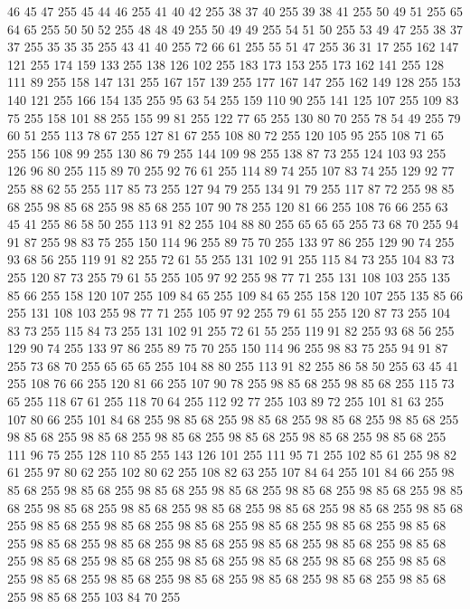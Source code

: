 46 45 47 255 45 44 46 255 41 40 42 255 38 37 40 255 39 38 41 255 50 49 51 255 65 64 65 255 50 50 52 255 48 48 49 255 50 49 49 255 54 51 50 255 53 49 47 255 38 37 37 255 35 35 35 255 43 41 40 255 72 66 61 255 55 51 47 255 36 31 17 255 162 147 121 255 174 159 133 255 138 126 102 255 183 173 153 255 173 162 141 255 128 111 89 255 158 147 131 255 167 157 139 255 177 167 147 255 162 149 128 255 153 140 121 255 166 154 135 255 95 63 54 255 159 110 90 255 141 125 107 255 109 83 75 255 158 101 88 255 155 99 81 255 122 77 65 255 130 80 70 255 78 54 49 255 79 60 51 255 113 78 67 255 127 81 67 255 108 80 72 255 120 105 95 255 108 71 65 255 156 108 99 255 130 86 79 255 144 109 98 255 138 87 73 255 124 103 93 255 126 96 80 255 115 89 70 255 92 76 61 255 114 89 74 255 107 83 74 255 129 92 77 255 88 62 55 255 117 85 73 255 127 94 79 255 134 91 79 255 117 87 72 255 98 85 68 255 98 85 68 255 98 85 68 255
107 90 78 255 120 81 66 255 108 76 66 255 63 45 41 255 86 58 50 255 113 91 82 255 104 88 80 255 65 65 65 255 73 68 70 255 94 91 87 255 98 83 75 255 150 114 96 255 89 75 70 255 133 97 86 255 129 90 74 255 93 68 56 255 119 91 82 255 72 61 55 255 131 102 91 255 115 84 73 255 104 83 73 255 120 87 73 255 79 61 55 255 105 97 92 255 98 77 71 255 131 108 103 255 135 85 66 255 158 120 107 255 109 84 65 255 109 84 65 255 158 120 107 255 135 85 66 255 131 108 103 255 98 77 71 255 105 97 92 255 79 61 55 255 120 87 73 255 104 83 73 255 115 84 73 255 131 102 91 255 72 61 55 255 119 91 82 255 93 68 56 255 129 90 74 255 133 97 86 255 89 75 70 255 150 114 96 255 98 83 75 255 94 91 87 255 73 68 70 255 65 65 65 255 104 88 80 255 113 91 82 255 86 58 50 255 63 45 41 255 108 76 66 255 120 81 66 255 107 90 78 255 98 85 68 255 98 85 68 255 115 73 65 255 118 67 61 255 118 70 64 255 112 92 77 255
103 89 72 255 101 81 63 255 107 80 66 255 101 84 68 255 98 85 68 255 98 85 68 255 98 85 68 255 98 85 68 255 98 85 68 255 98 85 68 255 98 85 68 255 98 85 68 255 98 85 68 255 98 85 68 255 111 96 75 255 128 110 85 255 143 126 101 255 111 95 71 255 102 85 61 255 98 82 61 255 97 80 62 255 102 80 62 255 108 82 63 255 107 84 64 255 101 84 66 255 98 85 68 255 98 85 68 255 98 85 68 255 98 85 68 255 98 85 68 255 98 85 68 255 98 85 68 255 98 85 68 255 98 85 68 255 98 85 68 255 98 85 68 255 98 85 68 255 98 85 68 255 98 85 68 255 98 85 68 255 98 85 68 255 98 85 68 255 98 85 68 255 98 85 68 255 98 85 68 255 98 85 68 255 98 85 68 255 98 85 68 255 98 85 68 255 98 85 68 255 98 85 68 255 98 85 68 255 98 85 68 255 98 85 68 255 98 85 68 255 98 85 68 255 98 85 68 255 98 85 68 255 98 85 68 255 98 85 68 255 98 85 68 255 98 85 68 255 98 85 68 255 103 84 70 255
